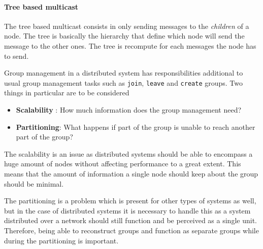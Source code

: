 \paragraph{Tree based multicast}{
\label{part:tree}
    The tree based multicast consists in only sending
 messages to the \textit{children} of a node. The
 tree is basically the hierarchy that define which node
 will send the message to the other ones. The tree is
 recompute for each messages the node has to send.
}

	Group management in a distributed system has responsibilities additional to usual group management tasks such as \texttt{join}, \texttt{leave} and \texttt{create} groups.
	Two things in particular are to be considered
	\begin{itemize}
		\item \textbf{Scalability} : How much information does the group management need?
		\item \textbf{Partitioning}: What happens if part of the group is unable to reach another part of the group?
	\end{itemize}

	The scalability is an issue as distributed systems should be able to encompass a huge amount of nodes without affecting performance to a great extent.
	This means that the amount of information a single node should keep about the group should be minimal.

	The partitioning is a problem which is present for other types of systems as well, but in the case of distributed systems it is necessary to handle this as a system distributed over a network should still function and be perceived as a single unit.
	Therefore, being able to reconstruct groups and function as separate groups while during the partitioning is important.

